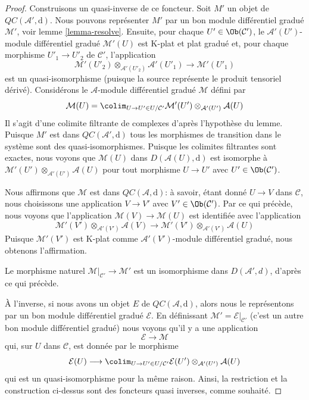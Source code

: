 \begin{proof}
Construisons un quasi-inverse de ce foncteur.
Soit $M'$ un objet de $\mathit{QC}(\mathcal{A}', \text{d})$.
Nous pouvons représenter $M'$ par un bon module différentiel gradué $\mathcal{M}'$, voir lemme \ref{lemma-resolve}.
Ensuite, pour chaque $U' \in \Ob(\mathcal{C}')$, le $\mathcal{A}'(U')$-module différentiel gradué $\mathcal{M}'(U)$ est K-plat et plat gradué et, pour chaque morphisme $U'_1 \to U'_2$ de $\mathcal{C}'$, l'application
$$
\mathcal{M}'(U'_2) \otimes_{\mathcal{A}'(U'_2)} \mathcal{A}'(U'_1)
\longrightarrow
\mathcal{M}'(U'_1)
$$
est un quasi-isomorphisme (puisque la source représente le produit tensoriel dérivé).
Considérons le $\mathcal{A}$-module différentiel gradué $\mathcal{M}$ défini par
$$
\mathcal{M}(U) =
\colim_{U \to U' \in U/\mathcal{C}'}
\mathcal{M}'(U') \otimes_{\mathcal{A}'(U')} \mathcal{A}(U)
$$
Il s'agit d'une colimite filtrante de complexes d'après l'hypothèse du lemme.
Puisque $M'$ est dans $\mathit{QC}(\mathcal{A}', \text{d})$ tous les morphismes de transition dans le système sont des quasi-isomorphismes.
Puisque les colimites filtrantes sont exactes, nous voyons que $\mathcal{M}(U)$ dans $D(\mathcal{A}(U), \text{d})$ est isomorphe à $\mathcal{M}'(U') \otimes_{\mathcal{A}'(U')} \mathcal{A}(U)$ pour tout morphisme $U \to U'$ avec $U' \in \Ob(\mathcal{C}')$.

\medskip\noindent
Nous affirmons que $\mathcal{M}$ est dans $\mathit{QC}(\mathcal{A}, \text{d})$: à savoir, étant donné $U \to V$ dans $\mathcal{C}$, nous choisissons une application $V \to V'$ avec $V' \in \Ob(\mathcal{C}')$.
Par ce qui précède, nous voyons que l'application $\mathcal{M}(V) \to \mathcal{M}(U)$ est identifiée avec l'application
$$
\mathcal{M}'(V') \otimes_{\mathcal{A}'(V')} \mathcal{A}(V)
\longrightarrow
\mathcal{M}'(V') \otimes_{\mathcal{A}'(V')} \mathcal{A}(U)
$$
Puisque $\mathcal{M'}(V')$ est K-plat comme $\mathcal{A}'(V')$-module différentiel gradué, nous obtenons l'affirmation.

\medskip\noindent
Le morphisme naturel $\mathcal{M}|_{\mathcal{C}'} \to \mathcal{M}'$ est un isomorphisme dans $D(\mathcal{A}', d)$, d'après ce qui précède.

\medskip\noindent
À l'inverse, si nous avons un objet $E$ de $\mathit{QC}(\mathcal{A}, \text{d})$, alors nous le représentons par un bon module différentiel gradué $\mathcal{E}$.
En définissant $\mathcal{M}' = \mathcal{E}|_{\mathcal{C}'}$ (c'est un autre bon module différentiel gradué) nous voyons qu'il y a une application
$$
\mathcal{E} \to \mathcal{M}
$$
qui, sur $U$ dans $\mathcal{C}$, est donnée par le morphisme
$$
\mathcal{E}(U)
\longrightarrow
\colim_{U \to U' \in U/\mathcal{C}'}
\mathcal{E}(U') \otimes_{\mathcal{A}'(U')} \mathcal{A}(U)
$$
qui est un quasi-isomorphisme pour la même raison.
Ainsi, la restriction et la construction ci-dessus sont des foncteurs quasi inverses, comme souhaité.
\end{proof}

